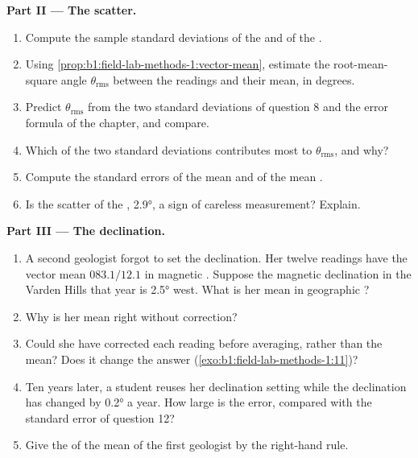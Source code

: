 \begin{problem}
\medskip
\noindent\textbf{Part II --- The scatter.}
\begin{enumerate}[resume]
  \item Compute the sample standard deviations of the  and of
        the .
  \item Using \cref{prop:b1:field-lab-methods-1:vector-mean}, estimate the
        root-mean-square angle $\theta_{\text{rms}}$ between the readings and
        their mean, in degrees.
  \item Predict $\theta_{\text{rms}}$ from the two standard deviations of
        question 8 and the error formula of the chapter, and compare.
  \item Which of the two standard deviations contributes most to
        $\theta_{\text{rms}}$, and why?
  \item Compute the standard errors of the mean  and of the mean .
  \item Is the scatter of the , \ang{2.9}, a sign of careless
        measurement? Explain.
\end{enumerate}

\medskip
\noindent\textbf{Part III --- The declination.}
\begin{enumerate}[resume]
  \item A second geologist forgot to set the declination. Her twelve readings
        have the vector mean $083.1/12.1$ in magnetic . Suppose the
        magnetic declination in the Varden Hills that year is \ang{2.5} west.
        What is her mean in geographic ?
  \item Why is her mean  right without correction?
  \item Could she have corrected each reading before averaging, rather than
        the mean? Does it change the answer (\cref{exo:b1:field-lab-methods-1:11})?
  \item Ten years later, a student reuses her declination setting while the
        declination has changed by \ang{0.2} a year. How large is the error,
        compared with the standard error of question 12?
  \item Give the  of the mean  of the first geologist by the
        right-hand rule.
\end{enumerate}


\end{problem}
